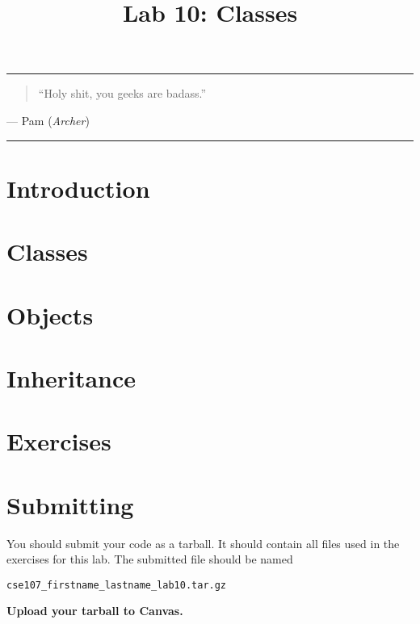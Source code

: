 \documentclass[11pt]{cselabheader}
\title{Lab 10: Classes}
\begin{document}
\maketitle

\hrule
\begin{quotation}
``Holy shit, you geeks are badass.''
\end{quotation}
\begin{flushright}
  --- Pam (\emph{Archer})
\end{flushright}

\hrule

\pagebreak
\section{Introduction}


\pagebreak

\section{Classes}
\label{sec:classes}


\section{Objects}
\label{sec:objects}


\section{Inheritance}
\label{sec:inheritance}


\clearpage
\section{Exercises}
\label{sec:ex}



\pagebreak
\section{Submitting}
You should submit your code as a tarball. It should contain all files
used in the exercises for this lab. The submitted file should be named
\begin{center}
  \texttt{cse107\_firstname\_lastname\_lab10.tar.gz}
\end{center}

\begin{center}
  \textbf{Upload your tarball to Canvas.}
\end{center}

\listoftheorems
\end{document}
